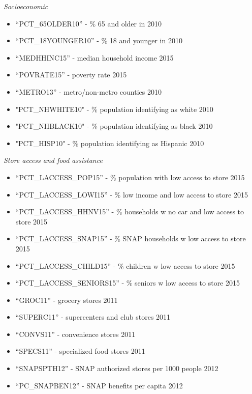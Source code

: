 \documentclass{article}
\begin{document}
\begin{itemize}[leftmargin=0pt]
\begin{enumerate}
        \textit{Socioeconomic}
        \begin{itemize}
            \item[] “PCT\_65OLDER10” - \% 65 and older in 2010
            \item[] “PCT\_18YOUNGER10” - \% 18 and younger in 2010
            \item[] “MEDHHINC15” - median household income 2015
            \item[] “POVRATE15” - poverty rate 2015
            \item[] “METRO13” - metro/non-metro counties 2010
            \item[] "PCT\_NHWHITE10" - \% population identifying as white 2010
            \item[] "PCT\_NHBLACK10" - \% population identifying as black 2010
            \item[] "PCT\_HISP10" - \% population identifying as Hispanic 2010
        \end{itemize}

        \textit{Store access and food assistance}
        \begin{itemize}
            \item[] “PCT\_LACCESS\_POP15” - \% population with low access to store 2015
            \item[] “PCT\_LACCESS\_LOWI15” - \% low income and low access to store 2015
            \item[] “PCT\_LACCESS\_HHNV15” - \% households w no car and low access to store 2015
            \item[] “PCT\_LACCESS\_SNAP15” - \% SNAP households w low access to store 2015
            \item[] “PCT\_LACCESS\_CHILD15” - \% children w low access to store 2015
            \item[] “PCT\_LACCESS\_SENIORS15” - \% seniors w low access to store 2015
            \item[] “GROC11” - grocery stores 2011
            \item[] “SUPERC11” - supercenters and club stores 2011
            \item[] “CONVS11” - convenience stores 2011
            \item[] “SPECS11” - specialized food stores 2011
            \item[] “SNAPSPTH12” - SNAP authorized stores per 1000 people 2012
            \item[] “PC\_SNAPBEN12” - SNAP benefits per capita 2012
        \end{itemize}


\end{enumerate}
\end{itemize}
\end{document}
